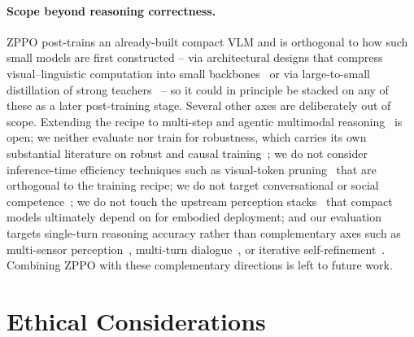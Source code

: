 \documentclass{llmxive}
\begin{document}
\paragraph{Scope beyond reasoning correctness.}
ZPPO post-trains an already-built compact VLM and is orthogonal to how such small models are first constructed -- via architectural designs that compress visual--linguistic computation into small backbones~\citep{lee-etal-2024-collavo,10.1007/978-3-031-72967-6_16,NEURIPS2024_473a9a75,lee-etal-2024-trol,lee2024phantom} or via large-to-small distillation of strong teachers~\citep{lee2025genrecal,lee2025building,yu2026hide} -- so it could in principle be stacked on any of these as a later post-training stage. Several other axes are deliberately out of scope. Extending the recipe to multi-step and agentic multimodal reasoning~\citep{Lee_2026_CVPR_Recursive,kang2026agent,cho2026spatialclawrethinkingactioninterface} is open; we neither evaluate nor train for robustness, which carries its own substantial literature on robust and causal training~\citep{lee2021towards,NEURIPS2021_8e5e15c4,Lee_2022_CVPR,Kim_2023_CVPR,Lee_2023_ICCV}; we do not consider inference-time efficiency techniques such as visual-token pruning~\citep{kim2026and} that are orthogonal to the training recipe; we do not target conversational or social competence~\citep{leeenhancing}; we do not touch the upstream perception stacks~\citep{lee2020training} that compact models ultimately depend on for embodied deployment; and our evaluation targets single-turn reasoning accuracy rather than complementary axes such as multi-sensor perception~\citep{yu2024spark}, multi-turn dialogue~\citep{Lee_2025_ICCV}, or iterative self-refinement~\citep{lee2026refinebench}. Combining ZPPO with these complementary directions is left to future work.




\section*{Ethical Considerations}
\label{sec:ethics}
\end{document}
